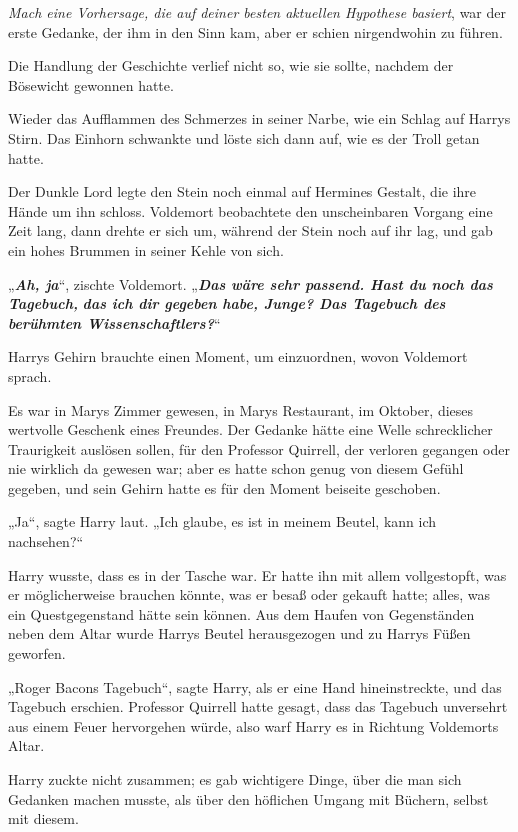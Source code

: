 {\emph{Mach eine Vorhersage, die auf deiner besten aktuellen Hypothese basiert}, war der erste Gedanke, der ihm in den Sinn kam, aber er schien nirgendwohin zu führen.

Die Handlung der Geschichte verlief nicht so, wie sie sollte, nachdem der Bösewicht gewonnen hatte.

Wieder das Aufflammen des Schmerzes in seiner Narbe, wie ein Schlag auf Harrys Stirn. Das Einhorn schwankte und löste sich dann auf, wie es der Troll getan hatte.

Der Dunkle Lord legte den Stein noch einmal auf Hermines Gestalt, die ihre Hände um ihn schloss. Voldemort beobachtete den unscheinbaren Vorgang eine Zeit lang, dann drehte er sich um, während der Stein noch auf ihr lag, und gab ein hohes Brummen in seiner Kehle von sich.

„\textbf{\emph{Ah, ja}}“, zischte Voldemort. „\textbf{\emph{Das wäre sehr passend. Hast du noch das Tagebuch,}} \textbf{\emph{das ich dir gegeben habe, Junge? Das Tagebuch des berühmten Wissenschaftlers?}}“

Harrys Gehirn brauchte einen Moment, um einzuordnen, wovon Voldemort sprach.

Es war in Marys Zimmer gewesen, in Marys Restaurant, im Oktober, dieses wertvolle Geschenk eines Freundes. Der Gedanke hätte eine Welle schrecklicher Traurigkeit auslösen sollen, für den Professor Quirrell, der verloren gegangen oder nie wirklich da gewesen war; aber es hatte schon genug von diesem Gefühl gegeben, und sein Gehirn hatte es für den Moment beiseite geschoben.

„Ja“, sagte Harry laut. „Ich glaube, es ist in meinem Beutel, kann ich nachsehen?“

Harry wusste, dass es in der Tasche war. Er hatte ihn mit allem vollgestopft, was er möglicherweise brauchen könnte, was er besaß oder gekauft hatte; alles, was ein Questgegenstand hätte sein können. Aus dem Haufen von Gegenständen neben dem Altar wurde Harrys Beutel herausgezogen und zu Harrys Füßen geworfen.

„Roger Bacons Tagebuch“, sagte Harry, als er eine Hand hineinstreckte, und das Tagebuch erschien. Professor Quirrell hatte gesagt, dass das Tagebuch unversehrt aus einem Feuer hervorgehen würde, also warf Harry es in Richtung Voldemorts Altar.

Harry zuckte nicht zusammen; es gab wichtigere Dinge, über die man sich Gedanken machen musste, als über den höflichen Umgang mit Büchern, selbst mit diesem.

}
